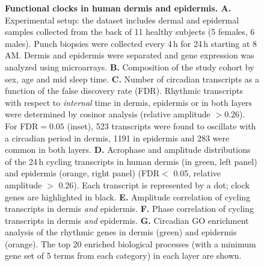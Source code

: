 \begin{figure}%
	\begin{center}
		\caption{\textbf{Functional clocks in human dermis and epidermis. A.} Experimental setup: the dataset includes dermal and epidermal samples collected from the back of 11 healthy subjects (5 females, 6 males). Punch biopsies were collected every 4\,h for 24\,h starting at 8\,AM. Dermis and epidermis were separated and gene expression was analyzed using microarrays.\textbf{ B. }Composition of the study cohort by sex, age and mid sleep time. \textbf{C. }Number of circadian transcripts as a function of the false discovery rate (FDR). Rhythmic transcripts with respect to \textit{internal} time in dermis, epidermis or in both layers were determined by cosinor analysis (relative amplitude $>0.26$). For FDR$=0.05$ (inset), 523 transcripts were found to oscillate with a circadian period in dermis, 1191 in epidermis and 283 were common in both layers. \textbf{D. }Acrophase and amplitude distributions of the 24\,h cycling transcripts in human dermis (in green, left panel) and epidermis (orange, right panel) (FDR$<$ 0.05, relative amplitude $>$ 0.26). Each transcript is represented by a dot; clock genes are highlighted in black. \textbf{E. }Amplitude correlation of cycling transcripts in dermis \textit{and} epidermis. \textbf{F. }Phase correlation of cycling transcripts in dermis \textit{and} epidermis. \textbf{G.} Circadian GO enrichment analysis of the rhythmic genes in dermis (green) and epidermis (orange). The top 20 enriched biological processes (with a minimum gene set of 5 terms from each category) in each layer are shown. } %
		\label{fig:fig1}
	\end{center}
\end{figure}


